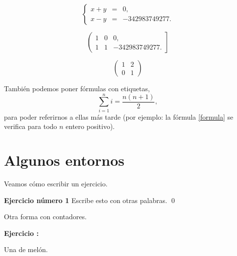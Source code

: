 \documentclass[11pt]{amsart}
\begin{document}
\[
\left\{
\begin{array}{lll}
x+y & = & 0,\\
x-y & = & -342983749277.
\end{array}
\right.
\]

\[
\left(
\begin{array}{lll}
1&  0 & 0,\\
1 & 1 & -342983749277.
\end{array}
\right]
\]

\[
\begin{pmatrix}
1 & 2 \\
0 & 1 
\end{pmatrix}
\]

También podemos poner fórmulas con etiquetas,
\begin{equation}\label{formula} %
\sum_{i=1}^n i=\frac{n(n+1)}2,
\end{equation}
para poder referirnos a ellas más tarde (por ejemplo: la fórmula \eqref{formula} se verifica para todo $n$ entero positivo). %

\section{Algunos entornos}

\newenvironment{ejercicio}[1]{\textbf{Ejercicio número #1}}{\qed}

Veamos cómo escribir un ejercicio.

\begin{ejercicio}{1}
Escribe esto con otras palabras.
\end{ejercicio}

Otra forma con contadores.
\setcounter{ejer_num}{1}
\newenvironment{ejer}{\textbf{Ejercicio : }\begin{itshape}}{\end{itshape}}

\begin{ejer}
Una de melón.
\end{ejer}
\end{document}
